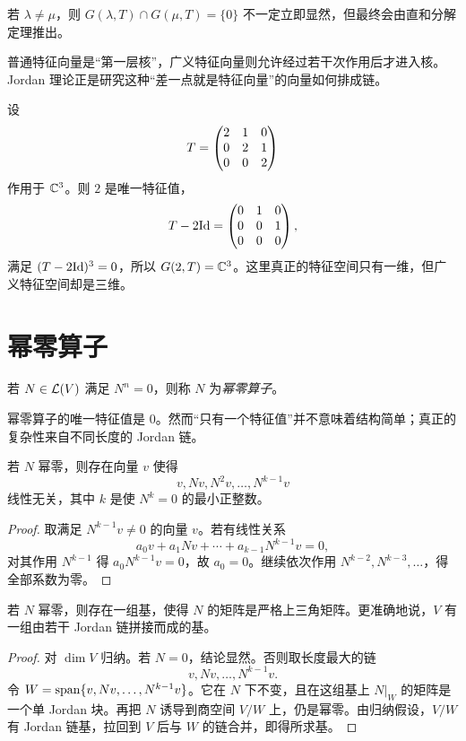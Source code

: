 \begin{proposition}
若 $\lambda\neq\mu$，则 $G(\lambda,T)\cap G(\mu,T)=\{0\}$ 不一定立即显然，但最终会由直和分解定理推出。
\end{proposition}

\begin{remark}
普通特征向量是“第一层核”，广义特征向量则允许经过若干次作用后才进入核。Jordan 理论正是研究这种“差一点就是特征向量”的向量如何排成链。
\end{remark}

\begin{example}
设
\[
T=\begin{pmatrix} 2&1&0\\0&2&1\\0&0&2 \end{pmatrix}
\]
作用于 $\mathbb{C}^3$。则 $2$ 是唯一特征值，
\[
T-2\mathrm{Id}=\begin{pmatrix} 0&1&0\\0&0&1\\0&0&0 \end{pmatrix},
\]
满足 $(T-2\mathrm{Id})^3=0$，所以 $G(2,T)=\mathbb{C}^3$。这里真正的特征空间只有一维，但广义特征空间却是三维。
\end{example}

\section{幂零算子}

\begin{definition}
若 $N\in\mathcal{L}(V)$ 满足 $N^n=0$，则称 $N$ 为\emph{幂零算子}。
\end{definition}

幂零算子的唯一特征值是 $0$。然而“只有一个特征值”并不意味着结构简单；真正的复杂性来自不同长度的 Jordan 链。

\begin{lemma}
若 $N$ 幂零，则存在向量 $v$ 使得
\[
v, Nv, N^2v,\dots,N^{k-1}v
\]
线性无关，其中 $k$ 是使 $N^k=0$ 的最小正整数。
\end{lemma}

\begin{proof}
取满足 $N^{k-1}v\neq0$ 的向量 $v$。若有线性关系
\[
a_0v+a_1Nv+\cdots+a_{k-1}N^{k-1}v=0,
\]
对其作用 $N^{k-1}$ 得 $a_0N^{k-1}v=0$，故 $a_0=0$。继续依次作用 $N^{k-2},N^{k-3},\dots$，得全部系数为零。
\end{proof}

\begin{theorem}
若 $N$ 幂零，则存在一组基，使得 $N$ 的矩阵是严格上三角矩阵。更准确地说，$V$ 有一组由若干 Jordan 链拼接而成的基。
\end{theorem}

\begin{proof}
对 $\dim V$ 归纳。若 $N=0$，结论显然。否则取长度最大的链
\[
v,Nv,\dots,N^{k-1}v.
\]
令 $W=\operatorname{span}\{v,Nv,\dots,N^{k-1}v\}$。它在 $N$ 下不变，且在这组基上 $N|_W$ 的矩阵是一个单 Jordan 块。再把 $N$ 诱导到商空间 $V/W$ 上，仍是幂零。由归纳假设，$V/W$ 有 Jordan 链基，拉回到 $V$ 后与 $W$ 的链合并，即得所求基。
\end{proof}

